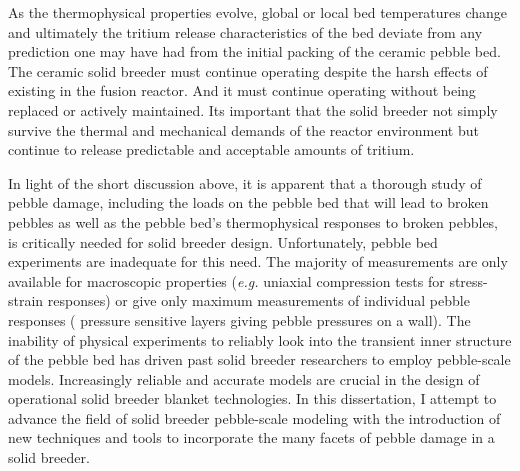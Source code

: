 As the thermophysical properties evolve, global or local bed temperatures change and ultimately the tritium release characteristics of the bed deviate from any prediction one may have had from the initial packing of the ceramic pebble bed. The ceramic solid breeder must continue operating despite the harsh effects of existing in the fusion reactor. And it must continue operating without being replaced or actively maintained. Its important that the solid breeder not simply survive the thermal and mechanical demands of the reactor environment but continue to release predictable and acceptable amounts of tritium. 



In light of the short discussion above, it is apparent that a thorough study of pebble damage, including the loads on the pebble bed that will lead to broken pebbles as well as the pebble bed's thermophysical responses to broken pebbles, is critically needed for solid breeder design. Unfortunately, pebble bed experiments are inadequate for this need. The majority of measurements are only available for macroscopic properties (\textit{e.g.} uniaxial compression tests for stress-strain responses) or give only maximum measurements of individual pebble responses ( pressure sensitive layers giving pebble pressures on a wall). The inability of physical experiments to reliably look into the transient inner structure of the pebble bed has driven past solid breeder researchers to employ pebble-scale models. Increasingly reliable and accurate models are crucial in the design of operational solid breeder blanket technologies. In this dissertation, I attempt to advance the field of solid breeder pebble-scale modeling with the introduction of new techniques and tools to incorporate the many facets of pebble damage in a solid breeder.



